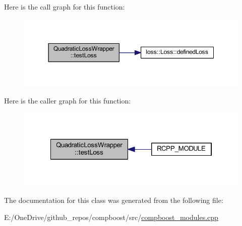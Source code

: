 Here is the call graph for this function\+:\nopagebreak
\begin{figure}[H]
\begin{center}
\leavevmode
\includegraphics[width=350pt]{class_quadratic_loss_wrapper_a9e179437d5d6cffc4e2eb41cf46a2666_cgraph}
\end{center}
\end{figure}
Here is the caller graph for this function\+:\nopagebreak
\begin{figure}[H]
\begin{center}
\leavevmode
\includegraphics[width=322pt]{class_quadratic_loss_wrapper_a9e179437d5d6cffc4e2eb41cf46a2666_icgraph}
\end{center}
\end{figure}


The documentation for this class was generated from the following file\+:\begin{DoxyCompactItemize}
\item 
E\+:/\+One\+Drive/github\+\_\+repos/compboost/src/\mbox{\hyperlink{compboost__modules_8cpp}{compboost\+\_\+modules.\+cpp}}\end{DoxyCompactItemize}
